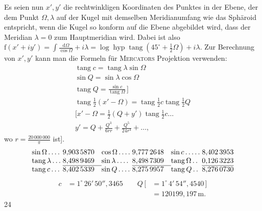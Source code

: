 Es seien nun \(x',y'\) die rechtwinkligen Koordinaten des Punktes in der Ebene, der dem Punkt \(\Omega,\lambda\) auf der Kugel mit demselben Meridianumfang wie das Sphäroid entspricht, wenn die Kugel so konform auf die Ebene abgebildet wird, dass der Meridian \(\lambda=0\) zum Hauptmeridian wird. Dabei ist also \(\mathrm{f}(x'+iy')=\int\frac{\mathrm{d}\Omega}{\cos\Omega}+i\lambda=\log\operatorname{hyp}\operatorname{tang}(45^\circ+\frac12\Omega)+i\lambda\). Zur Berechnung von \(x',y'\) kann man die Formeln für \textsc{Mercators} Projektion verwenden:
\[
\begin{gathered}
\operatorname{tang}c=\operatorname{tang}\lambda\sin\Omega\\
\sin Q=\sin\lambda\cos\Omega\\
\operatorname{tang}Q=\frac{\sin c}{\operatorname{tang}\Omega}\,]\\
\operatorname{tang}\tfrac12(x'-\Omega)=\operatorname{tang}\tfrac12c\operatorname{tang}\tfrac12Q\\
{[}x'-\Omega=\tfrac12(Q+y')\operatorname{tang}\tfrac12c\ldots\\
y'=Q+\frac{Q^3}{6rr}+\frac{Q^5}{24r^4}+\ldots,
\end{gathered}
\]
\noindent wo \(r=\frac{20\,000\,000}{\pi}\) ist].
\[
\begin{array}{@{}l@{\;}r@{\quad}l@{\;}r@{\quad}l@{\;}r@{}}
\sin\Omega\,.\,.\,.\,.&9{,}903\,5870&\cos\Omega\,.\,.\,.\,.&9{,}777\,2648&\sin c\,.\,.\,.\,.\,.&8{,}402\,3953\\
\operatorname{tang}\lambda\,.\,.\,.&8{,}498\,9469&\sin\lambda\,.\,.\,.\,.&8{,}498\,7309&\operatorname{tang}\Omega\,.\,.&0{,}126\,3223\\\cline{2-2}\cline{4-4}\cline{6-6}
\operatorname{tang}c\,.\,.\,.&8{,}402\,5339&\sin Q\,.\,.\,.\,.&8{,}275\,9957&\operatorname{tang}Q\,.\,.&8{,}276\,0730
\end{array}
\]
\[
\begin{aligned}
c&=1^\circ\,26'\,50''{,}3465\qquad
Q\,[&=1^\circ\,4'\,54''{,}4540\,]\\
&&=120199{,}197\,\mathrm{m}.
\end{aligned}
\]
\hfill{\small24}\hspace*{.12\linewidth}\par

